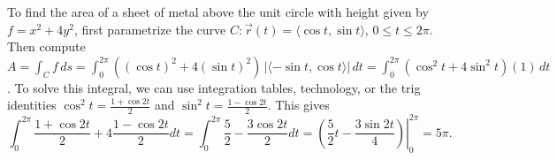 \begin{example}
%
 To find the area of a sheet of metal above the unit circle with
  height given by $f=x^2+4y^2$, first parametrize the curve $C\colon \vec
  r(t) = \langle\cos t,\sin t\rangle$, $0\leq t\leq 2\pi$. Then compute $A = \int_C f\,ds =
  \int_0^{2\pi} ((\cos t)^2 + 4 (\sin t)^2) \,|\langle-\sin t,\cos t\rangle|\,dt =
  \int_0^{2\pi} (\cos^2 t + 4 \sin^2 t) (1)\,dt$. To solve this integral,
  we can use integration tables, technology, or the trig identities
  $\cos^2 t= \frac{1+\cos 2t}{2}$ and $\sin^2 t = \frac{1-\cos
    2t}{2}$. This gives $$\int_0^{2\pi} \frac{1+\cos 2t}{2} +4 \frac{1-\cos
    2t}{2}dt = \int_0^{2\pi} \frac{5}{2} - \frac{3\cos 2t}{2}dt =
  \left.\left(\frac{5}{2}t - \frac{3\sin 2t}{4}\right)\right|_0^{2\pi} = 5\pi.$$
\end{example}

